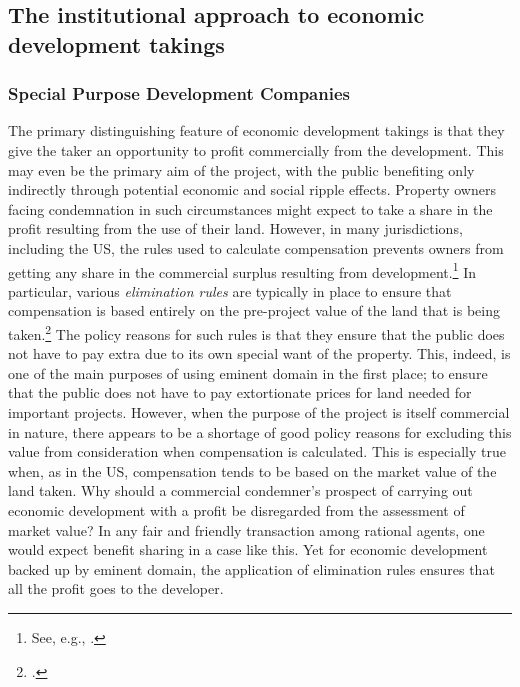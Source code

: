 \subsection{The institutional approach to economic development takings}\label{subsec:ins}

\subsubsection{Special Purpose Development Companies}

The primary distinguishing feature of economic development takings is that they give the taker an opportunity to profit commercially from the development. This may even be the primary aim of the project, with the public benefiting only indirectly through potential economic and social ripple effects. Property owners facing condemnation in such circumstances might expect to take a share in the profit resulting from the use of their land. However, in many jurisdictions, including the US, the rules used to calculate compensation prevents owners from getting any share in the commercial surplus resulting from development.\footnote{See, e.g., \cite[965-966]{fennell04}.} In particular, various {\it elimination rules} are typically in place to ensure that compensation is based entirely on the pre-project value of the land that is being taken.\footcite[See][81]{ackerman06} The policy reasons for such rules is that they ensure that the public does not have to pay extra due to its own special want of the property. This, indeed, is one of the main purposes of using eminent domain in the first place; to ensure that the public does not have to pay extortionate prices for land needed for important projects. However, when the purpose of the project is itself commercial in nature, there appears to be a shortage of good policy reasons for excluding this value from consideration when compensation is calculated. This is especially true when, as in the US, compensation tends to be based on the market value of the land taken. Why should a commercial condemner's prospect of carrying out economic development with a profit be disregarded from the assessment of market value? In any fair and friendly transaction among rational agents, one would expect benefit sharing in a case like this. Yet for economic development backed up by eminent domain, the application of elimination rules ensures that all the profit goes to the developer. 

